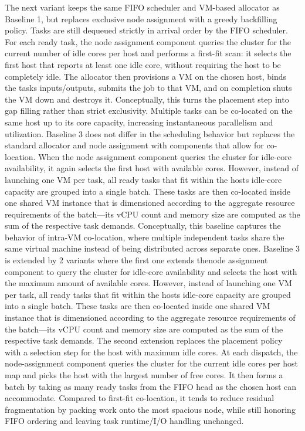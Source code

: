 The next variant keeps the same FIFO scheduler and VM-based allocator as Baseline 1, but replaces exclusive node assignment with a greedy backfilling policy. Tasks are still dequeued strictly in arrival order by the FIFO scheduler. For each ready task, the node assignment component queries the cluster for the current number of idle cores per host and performs a first-fit scan: it selects the first host that reports at least one idle core, without requiring the host to be completely idle. The allocator then provisions a VM on the chosen host, binds the tasks inputs/outputs, submits the job to that VM, and on completion shuts the VM down and destroys it.
Conceptually, this turns the placement step into gap filling rather than strict exclusivity. Multiple tasks can be co-located on the same host up to its core capacity, increasing instantaneous parallelism and utilization.
Baseline 3 does not differ in the scheduling behavior but replaces the standard allocator and node assignment with components that allow for co-location. When the node assignment component queries the cluster for idle-core availability, it again selects the first host with available cores. However, instead of launching one VM per task, all ready tasks that fit within the hosts idle-core capacity are grouped into a single batch. These tasks are then co-located inside one shared VM instance that is dimensioned according to the aggregate resource requirements of the batch—its vCPU count and memory size are computed as the sum of the respective task demands.
Conceptually, this baseline captures the behavior of intra-VM co-location, where multiple independent tasks share the same virtual machine instead of being distributed across separate ones.
Baseline 3 is extended by 2 variants where the first one extends thenode assignment component to query the cluster for idle-core availability and selects the host with the maximum amount of available cores. However, instead of launching one VM per task, all ready tasks that fit within the hosts idle-core capacity are grouped into a single batch. These tasks are then co-located inside one shared VM instance that is dimensioned according to the aggregate resource requirements of the batch—its vCPU count and memory size are computed as the sum of the respective task demands.
The second extension replaces the placement policy with a selection step for the host with maximum idle cores. At each dispatch, the node-assignment component queries the cluster for the current idle cores per host map and picks the host with the largest number of free cores. It then forms a batch by taking as many ready tasks from the FIFO head as the chosen host can accommodate. Compared to first-fit co-location, it tends to reduce residual fragmentation by packing work onto the most spacious node, while still honoring FIFO ordering and leaving task runtime/I/O handling unchanged.

